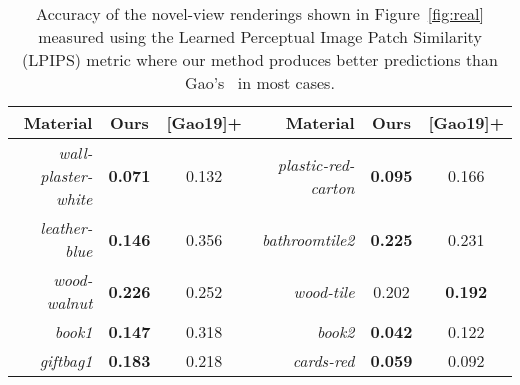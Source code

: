 %
\begin{table}[t]
    \centering
    \small
    \addtolength{\tabcolsep}{-3pt}
    \caption{\label{tab:accuracy}
    	Accuracy of the novel-view renderings shown in Figure~\ref{fig:real} measured using the Learned Perceptual Image Patch Similarity (LPIPS) metric where our method produces better predictions than Gao's~ in most cases.
    }
    \begin{tabular}{rccrcc}
        \textbf{Material} & \textbf{Ours} & \textbf{[Gao19]+} & \textbf{Material} & \textbf{Ours} & \textbf{[Gao19]+}\\
        \toprule
        \textit{wall-plaster-white} & \textbf{0.071} & 0.132 & \textit{plastic-red-carton} & \textbf{0.095} & 0.166 \\
        \textit{leather-blue} & \textbf{0.146} & 0.356 & \textit{bathroomtile2} & \textbf{0.225} & 0.231 \\
        \textit{wood-walnut} & \textbf{0.226} & 0.252 & \textit{wood-tile} & 0.202 & \textbf{0.192} \\
        \textit{book1} & \textbf{0.147} & 0.318 & \textit{book2} & \textbf{0.042} & 0.122 \\
        \textit{giftbag1} & \textbf{0.183} & 0.218 & \textit{cards-red} & \textbf{0.059} & 0.092 \\
        \bottomrule
    \end{tabular}
\end{table}
